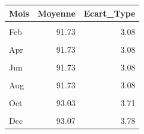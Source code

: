 \centering
\centering
\begin{tabular}[t]{lrr}
\toprule
Mois & Moyenne & Ecart\_Type\\
\midrule
\cellcolor{gray!10}{Jan} & \cellcolor{gray!10}{91.69} & \cellcolor{gray!10}{3.11}\\
Feb & 91.73 & 3.08\\
\cellcolor{gray!10}{Mar} & \cellcolor{gray!10}{91.73} & \cellcolor{gray!10}{3.08}\\
Apr & 91.73 & 3.08\\
\cellcolor{gray!10}{May} & \cellcolor{gray!10}{91.73} & \cellcolor{gray!10}{3.08}\\
Jun & 91.73 & 3.08\\
\cellcolor{gray!10}{Jul} & \cellcolor{gray!10}{91.73} & \cellcolor{gray!10}{3.08}\\
Aug & 91.73 & 3.08\\
\cellcolor{gray!10}{Sep} & \cellcolor{gray!10}{92.05} & \cellcolor{gray!10}{3.36}\\
Oct & 93.03 & 3.71\\
\cellcolor{gray!10}{Nov} & \cellcolor{gray!10}{93.07} & \cellcolor{gray!10}{3.78}\\
Dec & 93.07 & 3.78\\
\bottomrule
\end{tabular}

